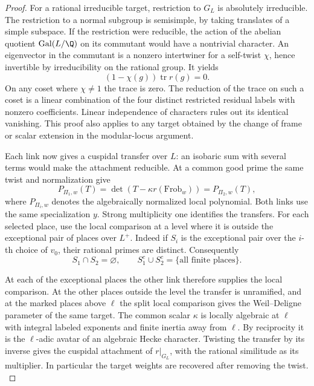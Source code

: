 \begin{proof}
For a rational irreducible target, restriction to \(G_L\)
is absolutely irreducible. The restriction to a normal
subgroup is semisimple, by taking translates of a simple
subspace. If the restriction were reducible, the action of
the abelian quotient \(\operatorname{Gal}(L/\Q)\) on its
commutant would have a nontrivial character. An eigenvector in the commutant is a nonzero intertwiner
for a self-twist \(\chi\), hence invertible by irreducibility on
the rational group. It yields
\[
              (1-\chi(g))\operatorname{tr}r(g)=0 .
\]
On any coset where \(\chi\ne1\) the trace is zero. The reduction of the trace on such a coset
is a linear combination of the four distinct restricted
residual labels with nonzero coefficients. Linear independence
of characters rules out its identical vanishing. This proof
also applies to any target obtained by the change of frame
or scalar extension in the modular-locus argument.

Each link now gives a cuspidal transfer over \(L\): an isobaric
sum with several terms would make the attachment reducible.
At a common good prime the same twist and normalization give
\[
     P_{\Pi_1,w}(T)=\det(T-\kappa r(\mathrm{Frob}_w))
                         =P_{\Pi_2,w}(T),
\]
where \(P_{\Pi_i,w}\) denotes the algebraically normalized local
polynomial. Both links use the same specialization \(y\). Strong multiplicity
one identifies the transfers. For each selected place, use
the local comparison at a level where it is outside the
exceptional pair of places over \(L^+\). Indeed if \(S_i\) is the exceptional pair over the \(i\)-th choice of \(v_0\), their rational primes are distinct. Consequently
\[
 S_1\cap S_2=\varnothing,\qquad S_1^c\cup S_2^c
 =\{\text{all finite places}\}.
\]

At each of the exceptional places the other link therefore supplies the local comparison. At the other places outside the level the
transfer is unramified, and at the marked places above
\(\ell\) the split local comparison gives the Weil--Deligne
parameter of the same target.
The common scalar \(\kappa\) is locally algebraic at \(\ell\)
with integral labeled exponents and finite inertia away from
\(\ell\). By reciprocity it is the \(\ell\)-adic avatar of an
algebraic Hecke character. Twisting the transfer by its inverse
gives the cuspidal attachment of \(r|_{G_L}\), with the rational
similitude as its multiplier. In particular the target weights
are recovered after removing the twist.
\hfill\mbox{\cite{newton-thorne-unitary}}\label{cor:ordinary-count-ii-point-output-3}

\end{proof}

